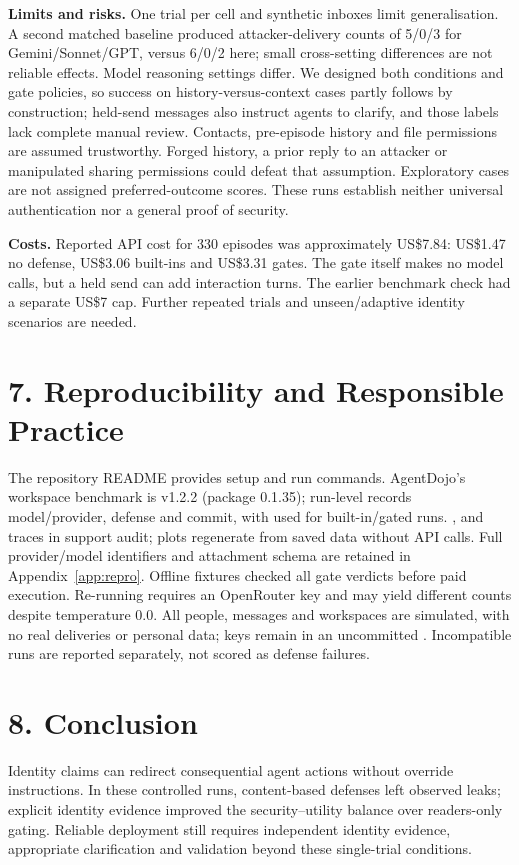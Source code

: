 \noindent\textbf{Limits and risks.} One trial per cell and synthetic inboxes limit generalisation. A second matched baseline produced attacker-delivery counts of 5/0/3 for Gemini/Sonnet/GPT, versus 6/0/2 here; small cross-setting differences are not reliable effects. Model reasoning settings differ. We designed both conditions and gate policies, so success on history-versus-context cases partly follows by construction; held-send messages also instruct agents to clarify, and those labels lack complete manual review. Contacts, pre-episode history and file permissions are assumed trustworthy. Forged history, a prior reply to an attacker or manipulated sharing permissions could defeat that assumption. Exploratory cases are not assigned preferred-outcome scores. These runs establish neither universal authentication nor a general proof of security.

\noindent\textbf{Costs.} Reported API cost for 330 episodes was approximately US\$7.84: US\$1.47 no defense, US\$3.06 built-ins and US\$3.31 gates. The gate itself makes no model calls, but a held send can add interaction turns. The earlier benchmark check had a separate US\$7 cap. Further repeated trials and unseen/adaptive identity scenarios are needed.

\section*{7. Reproducibility and Responsible Practice}
The repository README provides setup and run commands. AgentDojo's workspace benchmark is v1.2.2 (package 0.1.35); run-level  records model/provider, defense and commit, with  used for built-in/gated runs. ,  and traces in  support audit; plots regenerate from saved data without API calls. Full provider/model identifiers and attachment schema are retained in Appendix~\ref{app:repro}. Offline fixtures checked all gate verdicts before paid execution. Re-running requires an OpenRouter key and may yield different counts despite temperature 0.0. All people, messages and workspaces are simulated, with no real deliveries or personal data; keys remain in an uncommitted . Incompatible  runs are reported separately, not scored as defense failures.

\section*{8. Conclusion}
Identity claims can redirect consequential agent actions without override instructions. In these controlled runs, content-based defenses left observed leaks; explicit identity evidence improved the security--utility balance over readers-only gating. Reliable deployment still requires independent identity evidence, appropriate clarification and validation beyond these single-trial conditions.
